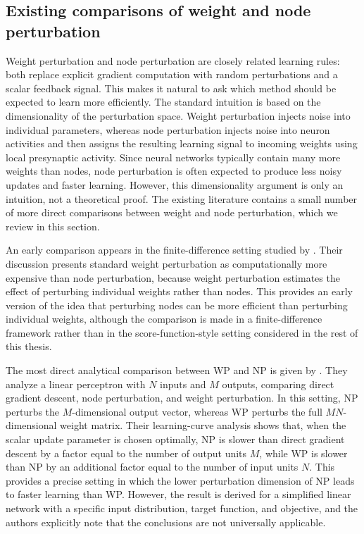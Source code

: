 \subsection{Existing comparisons of weight and node perturbation}

Weight perturbation and node perturbation are closely related learning rules: both replace explicit gradient computation with random perturbations and a scalar feedback signal. This makes it natural to ask which method should be expected to learn more efficiently. The standard intuition is based on the dimensionality of the perturbation space. Weight perturbation injects noise into individual parameters, whereas node perturbation injects noise into neuron activities and then assigns the resulting learning signal to incoming weights using local presynaptic activity. Since neural networks typically contain many more weights than nodes, node perturbation is often expected to produce less noisy updates and faster learning. However, this dimensionality argument is only an intuition, not a theoretical proof. The existing literature contains a small number of more direct comparisons between weight and node perturbation, which we review in this section.

An early comparison appears in the finite-difference setting studied by \textcite{flower_summed_1992}. Their discussion presents standard weight perturbation as computationally more expensive than node perturbation, because weight perturbation estimates the effect of perturbing individual weights rather than nodes. This provides an early version of the idea that perturbing nodes can be more efficient than perturbing individual weights, although the comparison is made in a finite-difference framework rather than in the score-function-style setting considered in the rest of this thesis.

The most direct analytical comparison between WP and NP is given by \textcite{werfel_learning_2003}. They analyze a linear perceptron with \(N\) inputs and \(M\) outputs, comparing direct gradient descent, node perturbation, and weight perturbation. In this setting, NP perturbs the \(M\)-dimensional output vector, whereas WP perturbs the full \(MN\)-dimensional weight matrix. Their learning-curve analysis shows that, when the scalar update parameter is chosen optimally, NP is slower than direct gradient descent by a factor equal to the number of output units \(M\), while WP is slower than NP by an additional factor equal to the number of input units \(N\). This provides a precise setting in which the lower perturbation dimension of NP leads to faster learning than WP. However, the result is derived for a simplified linear network with a specific input distribution, target function, and objective, and the authors explicitly note that the conclusions are not universally applicable.

